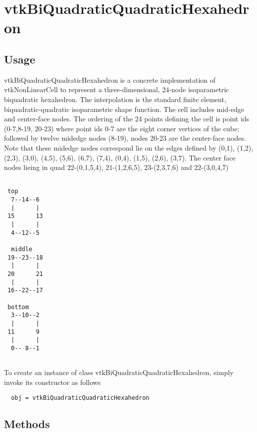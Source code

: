 \section{vtkBiQuadraticQuadraticHexahedron}

\subsection{Usage}

 vtkBiQuadraticQuadraticHexahedron is a concrete implementation of vtkNonLinearCell to
 represent a three-dimensional, 24-node isoparametric biquadratic
 hexahedron. The interpolation is the standard finite element,
 biquadratic-quadratic
 isoparametric shape function. The cell includes mid-edge and center-face nodes. The
 ordering of the 24 points defining the cell is point ids (0-7,8-19, 20-23)
 where point ids 0-7 are the eight corner vertices of the cube; followed by
 twelve midedge nodes (8-19), nodes 20-23 are the center-face nodes. Note that
 these midedge nodes correspond lie
 on the edges defined by (0,1), (1,2), (2,3), (3,0), (4,5), (5,6), (6,7),
 (7,4), (0,4), (1,5), (2,6), (3,7). The center face nodes lieing in quad
 22-(0,1,5,4), 21-(1,2,6,5), 23-(2,3,7,6) and 22-(3,0,4,7)

 \begin{verbatim}

 top 
  7--14--6
  |      |
 15      13
  |      |
  4--12--5

  middle
 19--23--18
  |      |
 20      21
  |      |
 16--22--17

 bottom
  3--10--2
  |      |
 11      9 
  |      |
  0-- 8--1
  
 \end{verbatim}



To create an instance of class vtkBiQuadraticQuadraticHexahedron, simply
invoke its constructor as follows
\begin{verbatim}
  obj = vtkBiQuadraticQuadraticHexahedron
\end{verbatim}
\subsection{Methods}

